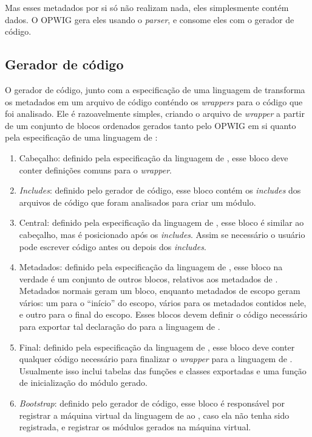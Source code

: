   Mas esses metadados por si só não realizam nada, eles simplesmente contém dados. O OPWIG gera 
  eles usando o \textit{parser}, e consome eles com o gerador de código.
  
  \subsection{Gerador de código}
  O gerador de código, junto com a especificação de uma linguagem de \script{} transforma os metadados
  em um arquivo de código \CXX{} conténdo os \textit{wrappers} para o código que foi analisado. Ele 
  é razoavelmente simples, criando o arquivo de \textit{wrapper} a partir de um conjunto de blocos
  ordenados gerados tanto pelo OPWIG em si quanto pela especificação de uma linguagem de \script{}:
  \begin{enumerate}
    \item Cabeçalho: definido pela especificação da linguagem de \script{}, esse bloco deve conter
      definições comuns para o \textit{wrapper}.
    \item \textit{Includes}: definido pelo gerador de código, esse bloco contém os \textit{includes}
      dos arquivos de código que foram analisados para criar um módulo.
    \item Central: definido pela especificação da linguagem de \script{}, esse bloco é similar ao 
      cabeçalho, mas é posicionado após os \textit{includes}. Assim se necessário o usuário pode
      escrever código antes ou depois dos \textit{includes}.
    \item Metadados: definido pela especificação da linguagem de \script{}, esse bloco na verdade é
      um conjunto de outros blocos, relativos aos metadados de \CXX{}. Metadados normais geram um
      bloco, enquanto metadados de escopo geram vários: um para o ``início'' do escopo, vários
      para os metadados contidos nele, e outro para o final do escopo. Esses blocos devem definir
      o código necessário para exportar tal declaração do \CXX{} para a linguagem de \script{}.
    \item Final: definido pela especificação da linguagem de \script{}, esse bloco deve conter
      qualquer código necessário para finalizar o \textit{wrapper} para a linguagem de \script{}.
      Usualmente isso inclui tabelas das funções e classes exportadas e uma função de inicialização
      do módulo gerado.
    \item \textit{Bootstrap}: definido pelo gerador de código, esse bloco é responsável por
      registrar a máquina virtual da linguagem de \script{} ao \SMgr{}, caso ela não tenha sido
      registrada, e registrar os módulos gerados na máquina virtual.
  \end{enumerate}
  

